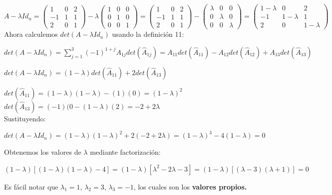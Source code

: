 \documentclass[letterpaper]{article}
\renewcommand{\*}{\cdot}
\theoremstyle{definition}
\begin{document}
	$A-\lambda Id_{n} = \begin{pmatrix} 1 & 0 & 2 \\ -1 & 1 & 1 \\ 2 & 0 & 1 \end{pmatrix} - \lambda \begin{pmatrix} 1 & 0 & 0 \\ 0 & 1 & 0 \\ 0 & 0 & 1 \end{pmatrix} = \begin{pmatrix} 1 & 0 & 2 \\ -1 & 1 & 1 \\ 2 & 0 & 1 \end{pmatrix} - \begin{pmatrix} \lambda & 0 & 0 \\ 0 & \lambda & 0  \\ 0 & 0 & \lambda \end{pmatrix} =\begin{pmatrix} 1-\lambda & 0 & 2 \\ -1 & 1-\lambda & 1 \\ 2 & 0 & 1-\lambda \end{pmatrix}$\\
	Ahora calculemos $det(A-\lambda Id_{n})$ usando la definición 11:
	\begin{center}
	$det(A-\lambda Id_{n}) = \sum_{j = 1}^{3} (-1)^{1+j} A_{1j} det(\hat{A}_{1j}) = A_{11} det(\hat{A}_{11})- A_{12} det(\hat{A}_{12}) + A_{13} det(\hat{A}_{13})$
	\end{center}
	\begin{center}
		$det(A-\lambda Id_{n}) = (1-\lambda) det(\hat{A}_{11}) + 2 det(\hat{A}_{13})$
	\end{center}
	$det(\hat{A}_{11}) = (1-\lambda)(1-\lambda)-(1)(0) = (1-\lambda)^{2}$\\
	$det(\hat{A}_{13}) = (-1)(0-(1-\lambda)(2) = -2+2\lambda$\\
	Sustituyendo:
	\begin{center}
		$det(A-\lambda Id_{n})= (1-\lambda)(1-\lambda)^{2} + 2 (-2+2\lambda) = (1-\lambda)^{3}-4(1-\lambda) = 0$
	\end{center}
	Obtenemos los valores de $\lambda$ mediante factorización:
	\begin{center}
	$(1-\lambda)[(1-\lambda)(1-\lambda)-4] = (1-\lambda)[\lambda^{2}-2\lambda -3] = (1-\lambda)[(\lambda -3)(\lambda +1)] = 0$
	\end{center}
	Es fácil notar que $\lambda_{1} = 1$,   $\lambda_{2} = 3$, $\lambda_{3} = -1$, los cuales son los \textbf{valores propios.}\\
\end{document}
